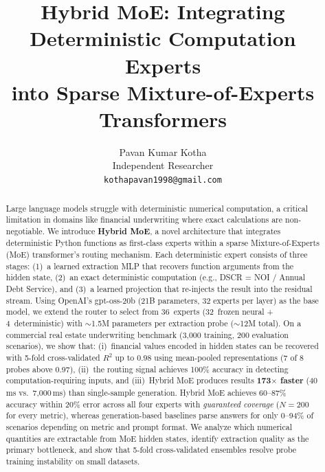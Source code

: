 \documentclass[11pt,a4paper]{article}
\title{Hybrid MoE: Integrating Deterministic Computation Experts \\
into Sparse Mixture-of-Experts Transformers}
\author{
Pavan Kumar Kotha \\
Independent Researcher \\
\texttt{kothapavan1998@gmail.com}
}
\date{}
\begin{document}
\maketitle

\begin{abstract}
Large language models struggle with deterministic numerical computation,
a critical limitation in domains like financial underwriting where exact
calculations are non-negotiable. We introduce \textbf{Hybrid MoE}, a
novel architecture that integrates deterministic Python functions as
first-class experts within a sparse Mixture-of-Experts (MoE) transformer's
routing mechanism. Each deterministic expert consists of three stages:
(1)~a learned extraction MLP that recovers function arguments from the
hidden state, (2)~an exact deterministic computation (e.g., DSCR = NOI /
Annual Debt Service), and (3)~a learned projection that re-injects the
result into the residual stream. Using OpenAI's gpt-oss-20b (21B parameters,
32 experts per layer) as the base model, we extend the router to select
from 36~experts (32~frozen neural + 4~deterministic) with
${\sim}$1.5M parameters per extraction probe (${\sim}$12M total). On a commercial real estate underwriting benchmark
(3{,}000 training, 200 evaluation scenarios), we show that:
(i)~financial values encoded in hidden states can be recovered with
5-fold cross-validated $R^2$ up to $0.98$ using mean-pooled
representations (7 of 8 probes above 0.97), (ii)~the routing signal achieves 100\% accuracy in
detecting computation-requiring inputs, and (iii)~Hybrid MoE produces
results \textbf{173$\times$ faster} (40\,ms vs.\ 7{,}000\,ms) than
single-sample generation. Hybrid MoE achieves 60--87\% accuracy within
20\% error across all four experts with \emph{guaranteed coverage}
($N{=}200$ for every metric), whereas generation-based baselines parse
answers for only 0--94\% of scenarios depending on metric and prompt
format. We analyze which numerical quantities are extractable from MoE
hidden states, identify extraction quality as the primary bottleneck,
and show that 5-fold cross-validated ensembles resolve probe training
instability on small datasets.
\end{abstract}











\appendix

\end{document}
